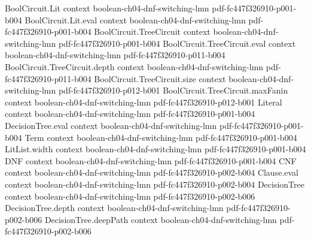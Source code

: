 \begin{theorem}
\label{LMN.circuit_reduction_aux}
\leanok
{}
\proofstep
  {BoolCircuit.Lit}
  {context}
  {boolean-ch04-dnf-switching-lmn}
  {pdf-fc447f326910-p001-b004}
\proofstep
  {BoolCircuit.Lit.eval}
  {context}
  {boolean-ch04-dnf-switching-lmn}
  {pdf-fc447f326910-p001-b004}
\proofstep
  {BoolCircuit.TreeCircuit}
  {context}
  {boolean-ch04-dnf-switching-lmn}
  {pdf-fc447f326910-p001-b004}
\proofstep
  {BoolCircuit.TreeCircuit.eval}
  {context}
  {boolean-ch04-dnf-switching-lmn}
  {pdf-fc447f326910-p011-b004}
\proofstep
  {BoolCircuit.TreeCircuit.depth}
  {context}
  {boolean-ch04-dnf-switching-lmn}
  {pdf-fc447f326910-p011-b004}
\proofstep
  {BoolCircuit.TreeCircuit.size}
  {context}
  {boolean-ch04-dnf-switching-lmn}
  {pdf-fc447f326910-p012-b001}
\proofstep
  {BoolCircuit.TreeCircuit.maxFanin}
  {context}
  {boolean-ch04-dnf-switching-lmn}
  {pdf-fc447f326910-p012-b001}
\proofstep
  {Literal}
  {context}
  {boolean-ch04-dnf-switching-lmn}
  {pdf-fc447f326910-p001-b004}
\proofstep
  {DecisionTree.eval}
  {context}
  {boolean-ch04-dnf-switching-lmn}
  {pdf-fc447f326910-p001-b004}
\proofstep
  {Term}
  {context}
  {boolean-ch04-dnf-switching-lmn}
  {pdf-fc447f326910-p001-b004}
\proofstep
  {LitList.width}
  {context}
  {boolean-ch04-dnf-switching-lmn}
  {pdf-fc447f326910-p001-b004}
\proofstep
  {DNF}
  {context}
  {boolean-ch04-dnf-switching-lmn}
  {pdf-fc447f326910-p001-b004}
\proofstep
  {CNF}
  {context}
  {boolean-ch04-dnf-switching-lmn}
  {pdf-fc447f326910-p002-b004}
\proofstep
  {Clause.eval}
  {context}
  {boolean-ch04-dnf-switching-lmn}
  {pdf-fc447f326910-p002-b004}
\proofstep
  {DecisionTree}
  {context}
  {boolean-ch04-dnf-switching-lmn}
  {pdf-fc447f326910-p002-b006}
\proofstep
  {DecisionTree.depth}
  {context}
  {boolean-ch04-dnf-switching-lmn}
  {pdf-fc447f326910-p002-b006}
\proofstep
  {DecisionTree.deepPath}
  {context}
  {boolean-ch04-dnf-switching-lmn}
  {pdf-fc447f326910-p002-b006}

\end{theorem}
